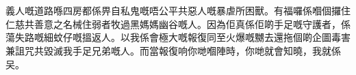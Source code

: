 \chapter{}
義人嘅道路喺四房都係畀自私鬼嘅唔公平共惡人嘅暴虐所困獸。有福囉係嗰個攞住仁慈共善意之名械住弱者牧過黑媽媽幽谷嘅人。因為佢真係佢啲手足嘅守護者，係蕩失路嘅細蚊仔嘅搵返人。以我係會極大嘅報復同至火爆嘅嬲去還拖個啲企圖毒害兼詛咒共毀滅我手足兄弟嘅人。而當報復响你哋嗰陣時，你哋就會知曉，我就係㕦。